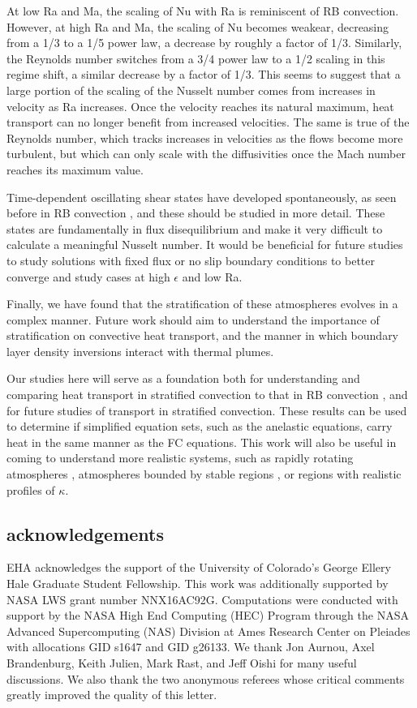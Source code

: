 \documentclass[aps, prl, twocolumn, nofootinbib, groupedaddress, amsfonts, amssymb, amsmath]{revtex4-1}
\begin{document}
At low Ra and Ma, the scaling of Nu with Ra is reminiscent of RB convection.  
However, at high Ra and Ma, the scaling of Nu becomes weakear, decreasing
from a 1/3 to a 1/5 power law, a decrease by roughly a factor of 1/3.
Similarly, the Reynolds number switches from a 3/4 power law to
a 1/2 scaling in this regime shift, a similar decrease by a factor of 1/3.
This seems to suggest that a large portion of the scaling of the Nusselt number
comes from increases in velocity as Ra increases.  Once the velocity reaches
its natural maximum, heat transport can no longer benefit from increased velocities.
The same is true of the Reynolds number, which tracks increases in velocities as
the flows become more turbulent, but which can only scale with the diffusivities
once the Mach number reaches its maximum value.

Time-dependent oscillating shear states have developed spontaneously, 
as seen before in RB convection \cite{goluskin&all2014}, and these should
be studied in more detail.  These states are fundamentally in flux disequilibrium
and make it very difficult to calculate a meaningful Nusselt number.  It would
be beneficial for future studies to study solutions with fixed flux or no slip
boundary conditions to better converge and study cases at high $\epsilon$ and low
Ra.

Finally, we have found that the stratification of 
these atmospheres evolves in a complex
manner.  Future work should aim to 
understand the importance of stratification on
convective heat transport, and the manner in which
boundary layer density inversions interact with
thermal plumes.

Our studies
here will serve as a foundation both for understanding and 
comparing heat transport in stratified convection
to that in RB convection \cite{johnston&doering2009}, 
and for future studies of transport in stratified convection.  
These results can be used to determine if simplified equation sets, 
such as the anelastic equations, carry heat in the same manner as the 
FC equations.
This work will also be useful in coming to understand more realistic systems, 
such as rapidly rotating atmospheres \cite{julien&all2012},
atmospheres bounded by stable regions \cite{hurlburt&all1986}, 
or regions with realistic profiles of $\kappa$.



\subsection{acknowledgements}
EHA acknowledges the support of the University of Colorado's George 
Ellery Hale Graduate Student Fellowship.
This work was additionally supported by  NASA LWS grant number NNX16AC92G.  
Computations were conducted 
with support by the NASA High End Computing (HEC) Program through the NASA 
Advanced Supercomputing (NAS) Division at Ames Research Center on Pleiades
with allocations GID s1647 and GID g26133.
We thank Jon Aurnou, Axel Brandenburg, Keith Julien, Mark Rast, and Jeff Oishi 
for many useful discussions. We also thank the two anonymous referees whose
critical comments greatly improved the quality of this letter.


\end{document}

